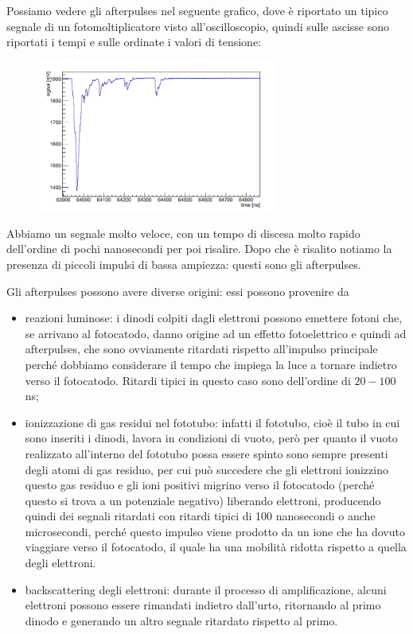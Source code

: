 Possiamo vedere gli afterpulses nel seguente grafico, dove è riportato un tipico segnale di un fotomoltiplicatore visto all'oscilloscopio, quindi sulle ascisse sono riportati i tempi e sulle ordinate i valori di tensione:
\begin{figure}[H]
   \centering
   \includegraphics[width=0.7\textwidth]{immagini/afterpulses.png}
\end{figure}
Abbiamo un segnale molto veloce, con un tempo di discesa molto rapido dell'ordine di pochi nanosecondi per poi risalire. Dopo che è risalito notiamo la presenza di piccoli impulsi di bassa ampiezza: questi sono gli afterpulses.

Gli afterpulses possono avere diverse origini: essi possono provenire da
\begin{itemize}[leftmargin=0.5cm]
   \item reazioni luminose: i dinodi colpiti dagli elettroni possono emettere fotoni che, se arrivano al fotocatodo, danno origine ad un effetto fotoelettrico e quindi ad afterpulses, che sono ovviamente ritardati rispetto all'impulso principale perché dobbiamo considerare il tempo che impiega la luce a tornare indietro verso il fotocatodo. Ritardi tipici in questo caso sono dell'ordine di $20-100$ ns;
   \item ionizzazione di gas residui nel fototubo: infatti il fototubo, cioè il tubo in cui sono inseriti i dinodi, lavora in condizioni di vuoto, però per quanto il vuoto realizzato all'interno del fototubo possa essere spinto sono sempre presenti degli atomi di gas residuo, per cui può succedere che gli elettroni ionizzino questo gas residuo e gli ioni positivi migrino verso il fotocatodo (perché questo si trova a un potenziale negativo) liberando elettroni, producendo quindi dei segnali ritardati con ritardi tipici di 100 nanosecondi o anche microsecondi, perché questo impulso viene prodotto da un ione che ha dovuto viaggiare verso il fotocatodo, il quale ha una mobilità ridotta rispetto a quella degli elettroni.
   \item backscattering degli elettroni: durante il processo di amplificazione, alcuni elettroni possono essere rimandati indietro dall'urto, ritornando al primo dinodo e generando un altro segnale ritardato rispetto al primo.
\end{itemize}

